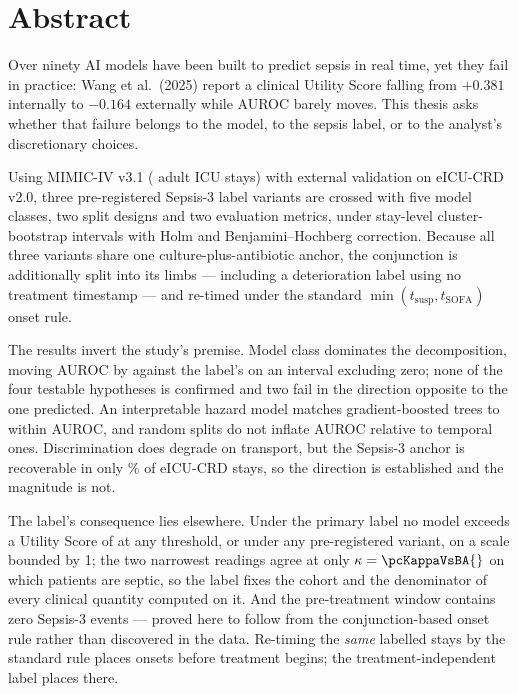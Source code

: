 \chapter*{Abstract}
\vspace*{-3\baselineskip}

Over ninety AI models have been built to predict sepsis in real time, yet they
fail in practice: Wang et al.\ (2025) report a clinical Utility Score falling
from $+0.381$ internally to $-0.164$ externally while AUROC barely moves. This
thesis asks whether that failure belongs to the model, to the sepsis label, or
to the analyst's discretionary choices.

Using MIMIC-IV v3.1 (\pcNStays{} adult ICU stays) with external validation on
eICU-CRD v2.0, three pre-registered Sepsis-3 label variants are crossed with
five model classes, two split designs and two evaluation metrics, under
stay-level cluster-bootstrap intervals with Holm and Benjamini--Hochberg
correction. Because all three variants share one culture-plus-antibiotic
anchor, the conjunction is additionally split into its limbs --- including a
deterioration label using no treatment timestamp --- and re-timed under the
standard $\min(t_{\text{susp}}, t_{\text{SOFA}})$ onset rule.

The results invert the study's premise. Model class dominates the
decomposition, moving AUROC by \pcSpreadModelClass{} against the label's
\pcSpreadLabel{} on an interval excluding zero; none of the four testable
hypotheses is confirmed and two fail in the direction opposite to the one
predicted. An interpretable hazard model matches gradient-boosted trees to
within \pcHSixEst{} AUROC, and random splits do not inflate AUROC relative to
temporal ones. Discrimination does degrade on transport, but the Sepsis-3
anchor is recoverable in only \pcExtMicroCoverage\% of eICU-CRD stays, so the
direction is established and the magnitude is not.

The label's consequence lies elsewhere. Under the primary label no model
exceeds a Utility Score of \pcUtilityMaxGbtB{} at any threshold, or
\pcUtilityMaxGbtC{} under any pre-registered variant, on a scale bounded by 1;
the two
narrowest readings agree at only $\kappa = \pcKappaVsBA{}$ on which patients are
septic,
so the label fixes the cohort and the denominator of every clinical quantity
computed on it. And the pre-treatment window contains zero Sepsis-3 events ---
proved here to follow from the conjunction-based onset rule rather than
discovered in the data. Re-timing the \emph{same} labelled stays by the
standard rule places \pcPreTreatOnsetsVarF{} onsets before treatment begins;
the treatment-independent label places \pcPreTreatOnsetsVarD{} there.

